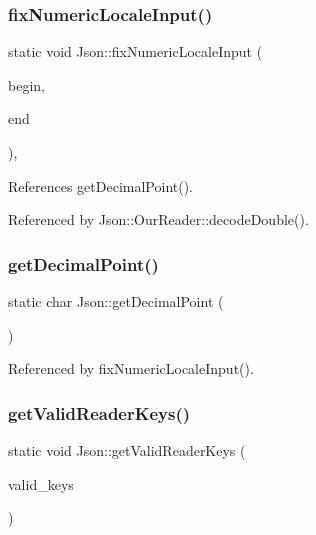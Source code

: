\subsubsection{\texorpdfstring{fix\+Numeric\+Locale\+Input()}{fixNumericLocaleInput()}}
{\footnotesize\ttfamily static void Json\+::fix\+Numeric\+Locale\+Input (\begin{DoxyParamCaption}\item[{char $\ast$}]{begin,  }\item[{char $\ast$}]{end }\end{DoxyParamCaption})\hspace{0.3cm}{\ttfamily [inline]}, {\ttfamily [static]}}



References get\+Decimal\+Point().



Referenced by Json\+::\+Our\+Reader\+::decode\+Double().

\mbox{\label{namespaceJson_ac99d7a5551039dfa712dd1d143c25a16_ac99d7a5551039dfa712dd1d143c25a16}} 
\subsubsection{\texorpdfstring{get\+Decimal\+Point()}{getDecimalPoint()}}
{\footnotesize\ttfamily static char Json\+::get\+Decimal\+Point (\begin{DoxyParamCaption}{ }\end{DoxyParamCaption})\hspace{0.3cm}{\ttfamily [static]}}



Referenced by fix\+Numeric\+Locale\+Input().

\mbox{\label{namespaceJson_a8c38450840f3d88e9b981ae132f7ad0a_a8c38450840f3d88e9b981ae132f7ad0a}} 
\subsubsection{\texorpdfstring{get\+Valid\+Reader\+Keys()}{getValidReaderKeys()}}
{\footnotesize\ttfamily static void Json\+::get\+Valid\+Reader\+Keys (\begin{DoxyParamCaption}\item[{std\+::set$<$ \hyperlink{json_8h_a1e723f95759de062585bc4a8fd3fa4be_a1e723f95759de062585bc4a8fd3fa4be}{J\+S\+O\+N\+C\+P\+P\+\_\+\+S\+T\+R\+I\+NG} $>$ $\ast$}]{valid\+\_\+keys }\end{DoxyParamCaption})\hspace{0.3cm}{\ttfamily [static]}}



